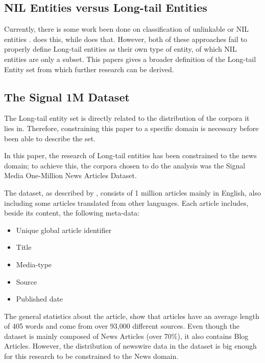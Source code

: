 \subsection{NIL Entities versus Long-tail Entities}
Currently, there is some work been done on classification of unlinkable or NIL entities \cite{someone}.
\cite{someone} does this, while \cite{someone} does that.
However, both of these approaches fail to properly define Long-tail entities as their own type of entity, of which NIL entities are only a subset.
This papers gives a broader definition of the Long-tail Entity set from which further research can be derived. 

\subsection{The Signal 1M Dataset}
The Long-tail entity set is directly related to the distribution of the corpora it lies in.
Therefore, constraining this paper to a specific domain is necessary before been able to describe the set.

In this paper, the research of Long-tail entities has been constrained to the news domain;
to achieve this, the corpora chosen to do the analysis was the Signal Media One-Million News Articles Dataset\cite{Signal1M2016}.

The dataset, as described by \cite{Signal1M2016}, consists of 1 million articles mainly in English,
also including some articles translated from other languages.
Each article includes, beside its content, the following meta-data:
\begin{itemize}
\item Unique global article identifier
\item Title
\item Media-type
\item Source
\item Published date
\end{itemize}

The general statistics about the article, show that articles have an average length of 405 words and come from over 93,000 different sources.
Even though the dataset is mainly composed of News Articles (over 70\%), it also contains Blog Articles\cite{Signal1M2016}.
However, the distribution of newswire data in the dataset is big enough for this research to be constrained to the News domain.

